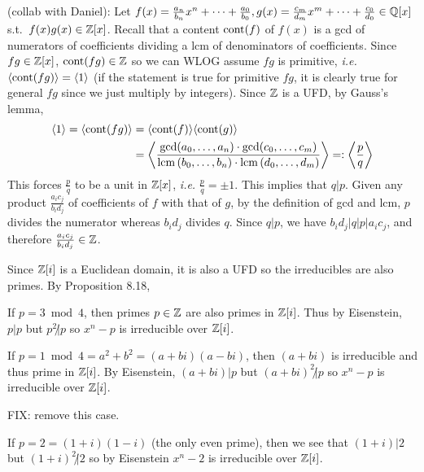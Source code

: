 \documentclass[12pt]{article}
\begin{document}
\begin{problem}[4]
	(collab with Daniel): Let $f(x) = \frac{a_n}{ b_n}x^{n}+ \cdots + \frac{a_0}{ b_0},g(x)=\frac{c_m}{ d_m} x^{m} + \cdots + \frac{c_0}{ d_0} \in \mathbb{Q}[x] $ s.t.\ $ f(x)g(x) \in \mathbb{Z}[x]$. Recall that a content $ \operatorname{cont}( f) $ of $ f(x)$ is a gcd of numerators of coefficients dividing a lcm of denominators of coefficients. Since $ fg \in \mathbb{Z}[x]$, $ \operatorname{cont}( fg) \in \mathbb{Z}$ so we can WLOG assume $ fg$ is primitive,  \emph{i.e.} $ \langle \operatorname{cont}( fg)  \rangle = \langle 1 \rangle$ (if the statement is true for primitive $ fg$, it is clearly true for general $ fg$ since we just multiply by integers). Since $ \mathbb{Z}$ is a UFD, by Gauss's lemma,
	\begin{align*}
		\langle 1 \rangle = \langle \operatorname{cont}( fg)  \rangle &= \langle \operatorname{cont}( f)  \rangle \langle \operatorname{cont}( g)  \rangle \\
		&=\left\langle \frac{\gcd ( a_0,\ldots,a_n) \cdot \gcd ( c_0,\ldots,c_m) }{ \operatorname{lcm} \left( b_0,\ldots,b_n \right) \cdot \operatorname{lcm} \left( d_0,\ldots,d_m \right) } \right\rangle =: \left \langle  \frac{p}{ q} \right\rangle 
	\end{align*}
	This forces $ \frac{p}{q}$ to be a unit in $ \mathbb{Z}[x]$, \emph{i.e.} $ \frac{p}{q} = \pm 1$. This implies that $ q|p$. Given any product $ \frac{a_i c_j}{ b_i d_j}$ of coefficients of $ f$ with that of  $ g$, by the definition of gcd and lcm, $ p$ divides the numerator whereas $ b_i d_j$ divides $ q$. Since $ q|p$, we have  $ b_i d_j | q|p| a_i c_j$, and therefore $ \frac{a_i c_j}{ b_i d_j} \in \mathbb{Z}$.
\end{problem}
\begin{problem}[5]
	Since $ \mathbb{Z}[i]$ is a Euclidean domain, it is also a UFD so the irreducibles are also primes. By Proposition 8.18,
\begin{case}[1]
	If $ p = 3 \bmod 4$, then primes $ p \in \mathbb{Z}$ are also primes in $ \mathbb{Z}[i]$. Thus by Eisenstein, $ p|p$ but  $ p^2 \not | p$ so $ x^{n}-p$ is irreducible over $ \mathbb{Z}[i]$.
\end{case}
\begin{case}[2]
	If $ p=1 \bmod 4 = a^2+b^2 = (a+bi)(a-bi)$, then $ (a+bi)$ is irreducible and thus prime in  $ \mathbb{Z}[i]$. By Eisenstein, $ (a+bi) |p$ but  $ (a+bi)^2 \not | p$ so $ x^{n}-p$ is irreducible over $ \mathbb{Z}[i]$.
\end{case}

FIX: remove this case.
\begin{case}[3]
	If $ p=2=(1+i)(1-i)$ (the only even prime), then we see that $(1+i)|2 $ but $ (1+i)^2 \not | 2$ so by Eisenstein $ x^{n}-2$ is irreducible over $ \mathbb{Z}[i]$. 
\end{case}
\end{problem}
\end{document}
